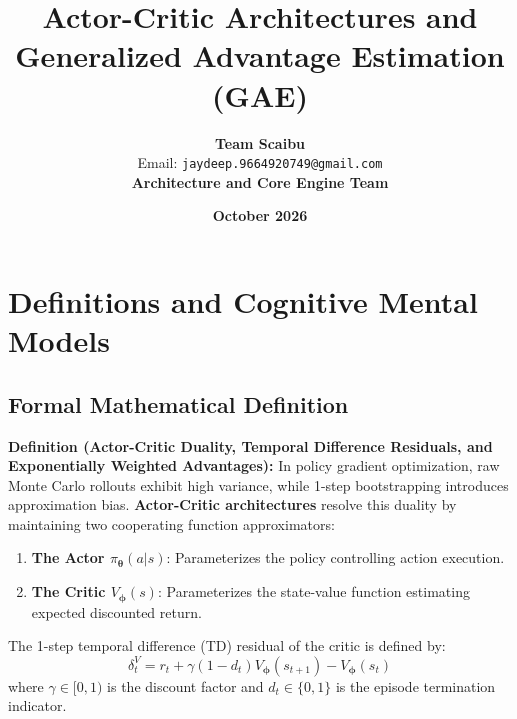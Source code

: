 \documentclass[11pt,a4paper]{article}
\title{\textbf{Actor-Critic Architectures and Generalized Advantage Estimation (GAE)}}
\author{\textbf{Team Scaibu} \\ \small Email: \texttt{jaydeep.9664920749@gmail.com} \\ \small \textbf{Architecture and Core Engine Team}}
\date{\textbf{October 2026}}
\theoremstyle{definition}
\begin{document}
\maketitle

\section{Definitions and Cognitive Mental Models}

\subsection{Formal Mathematical Definition}
\textbf{Definition (Actor-Critic Duality, Temporal Difference Residuals, and Exponentially Weighted Advantages):}
In policy gradient optimization, raw Monte Carlo rollouts exhibit high variance, while 1-step bootstrapping introduces approximation bias. \textbf{Actor-Critic architectures} resolve this duality by maintaining two cooperating function approximators:
\begin{enumerate}
    \item \textbf{The Actor $\pi_{\boldsymbol{\theta}}(a | s)$}: Parameterizes the policy controlling action execution.
    \item \textbf{The Critic $V_{\boldsymbol{\phi}}(s)$}: Parameterizes the state-value function estimating expected discounted return.
\end{enumerate}
The 1-step temporal difference (TD) residual of the critic is defined by:
{\boldmath
\begin{equation}
\delta_t^V = r_t + \gamma (1 - d_t) V_{\boldsymbol{\phi}}(s_{t+1}) - V_{\boldsymbol{\phi}}(s_t)
\end{equation}
}
where $\gamma \in [0, 1)$ is the discount factor and $d_t \in \{0, 1\}$ is the episode termination indicator.
\end{document}
